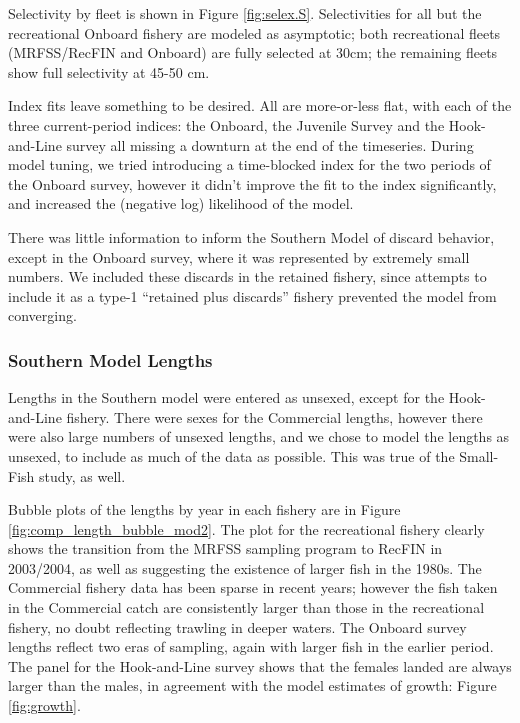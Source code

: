 \documentclass[12pt,]{article}
\begin{document}
Selectivity by fleet is shown in Figure \ref{fig:selex.S}. Selectivities
for all but the recreational Onboard fishery are modeled as asymptotic;
both recreational fleets (MRFSS/RecFIN and Onboard) are fully selected
at 30cm; the remaining fleets show full selectivity at 45-50 cm.

Index fits leave something to be desired. All are more-or-less flat,
with each of the three current-period indices: the Onboard, the Juvenile
Survey and the Hook-and-Line survey all missing a downturn at the end of
the timeseries. During model tuning, we tried introducing a time-blocked
index for the two periods of the Onboard survey, however it didn't
improve the fit to the index significantly, and increased the (negative
log) likelihood of the model.

There was little information to inform the Southern Model of discard
behavior, except in the Onboard survey, where it was represented by
extremely small numbers. We included these discards in the retained
fishery, since attempts to include it as a type-1 ``retained plus
discards'' fishery prevented the model from converging.

\subsubsection{Southern Model Lengths}\label{southern-model-lengths}

Lengths in the Southern model were entered as unsexed, except for the
Hook-and-Line fishery. There were sexes for the Commercial lengths,
however there were also large numbers of unsexed lengths, and we chose
to model the lengths as unsexed, to include as much of the data as
possible. This was true of the Small-Fish study, as well.

Bubble plots of the lengths by year in each fishery are in Figure
\ref{fig:comp_length_bubble_mod2}. The plot for the recreational fishery
clearly shows the transition from the MRFSS sampling program to RecFIN
in 2003/2004, as well as suggesting the existence of larger fish in the
1980s. The Commercial fishery data has been sparse in recent years;
however the fish taken in the Commercial catch are consistently larger
than those in the recreational fishery, no doubt reflecting trawling in
deeper waters. The Onboard survey lengths reflect two eras of sampling,
again with larger fish in the earlier period. The panel for the
Hook-and-Line survey shows that the females landed are always larger
than the males, in agreement with the model estimates of growth: Figure
\ref{fig:growth}.
\end{document}
